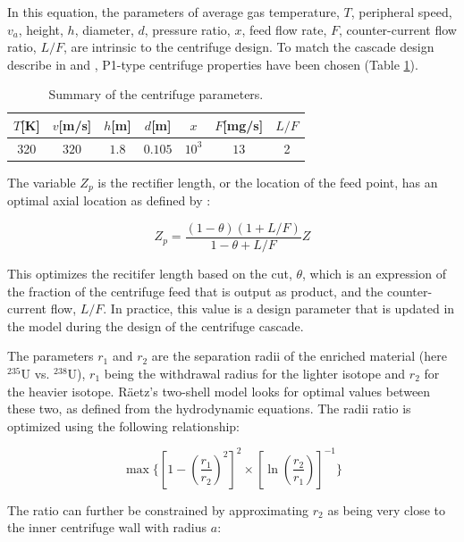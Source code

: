 In this equation, the parameters of average gas temperature, $T$, peripheral speed,
$v_a$, height, $h$, diameter, $d$, pressure ratio, $x$, feed flow rate, $F$,
counter-current flow ratio, $L/F$, are intrinsic to the centrifuge design.
To match the cascade design describe in \cite{glaser.2008} and \cite{walker.2017},
P1-type centrifuge properties have been chosen (Table \ref{tab:centrifuges}).

\begin{table}[htb]
    \centering
    \caption{Summary of the centrifuge parameters.}
    \begin{tabular}{ccccccc}
        \toprule
        $T$[K] & $v$[m/s] & $h$[m] & $d$[m]   & $x$      & $F$[mg/s]  & $L/F$  \\
        \midrule
        320    & $320$    & $1.8$  & $0.105$  & $10^{3}$ & $13$       & 2   \\
        \bottomrule
    \end{tabular}
    \label{tab:centrifuges}
\end{table}

The variable $Z_p$ is the rectifier length, or the location of the feed point, has
an optimal axial location as defined by \cite{raetz.phd}:

\begin{equation}
    Z_p = \frac{(1-\theta)(1+L/F)}{1-\theta+L/F}Z
\end{equation}

This optimizes the recitifer length based on the cut, $\theta$, which is an expression
of the fraction of the centrifuge feed that is output as product, and the counter-current
flow, $L/F$. In practice, this value is a design parameter that is updated in the model
during the design of the centrifuge cascade.

The parameters $r_1$ and $r_2$ are the separation radii of the enriched material
(here ${}^{235}\mathrm{U}$ vs. ${}^{238}\mathrm{U}$), $r_1$ being the withdrawal
radius for the lighter isotope and $r_2$ for the heavier isotope. R\"aetz's
two-shell model looks for optimal values between these two, as defined from
the hydrodynamic equations. The radii ratio is optimized using the following relationship:

\begin{equation}
    \max\{[1-(\frac{r_1}{r_2})^2]^2 \times [ \ln(\frac{r_2}{r_1})]^{-1}\}
\end{equation}

The ratio can further be constrained by approximating $r_2$ as being very close
to the inner centrifuge wall with radius $a$:

